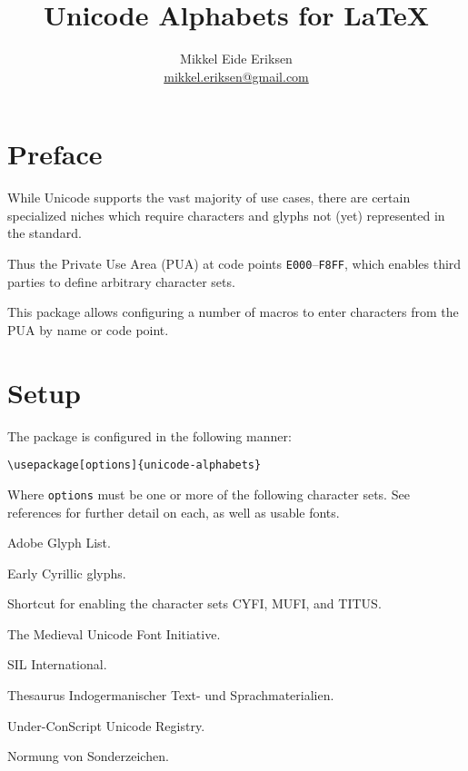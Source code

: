 \documentclass{article}
\title{Unicode Alphabets for \LaTeX}
\author{Mikkel Eide Eriksen\\\href{mailto:mikkel.eriksen@gmail.com}{mikkel.eriksen@gmail.com}}
\begin{document}
\maketitle

\section{Preface}

While Unicode supports the vast majority of use cases, there are certain specialized niches which require characters and glyphs not (yet) represented in the standard.

Thus the Private Use Area (PUA) at code points \texttt{E000}--\texttt{F8FF}, which enables third parties to define arbitrary character sets.

This package allows configuring a number of macros to enter characters from the PUA by name or code point.

\section{Setup}

The package is configured in the following manner:

\begin{verbatim}
\usepackage[options]{unicode-alphabets}
\end{verbatim}

Where \verb|options| must be one or more of the following character sets. See references for further detail on each, as well as usable fonts.

\begin{description}[labelindent=1cm, leftmargin=*, rightmargin=\leftmargin]

\item[AGL] Adobe Glyph List\cite{AGL}.
\item[CYFI] Early Cyrillic glyphs\cite{CYFI}.
\item[LINCUA] Shortcut for enabling the character sets CYFI, MUFI, and TITUS\cite{LINCUA}.
\item[MUFI] The Medieval Unicode Font Initiative\cite{MUFI}.
\item[SIL] SIL International\cite{SIL}.
\item[TITUS] Thesaurus Indogermanischer Text- und Sprachmaterialien\cite{TITUS}.
\item[UCSUR] Under-ConScript Unicode Registry\cite{UCSUR}.
\item[UNZ] Normung von Sonderzeichen\cite{UNZ}.

\end{description}
\end{document}

